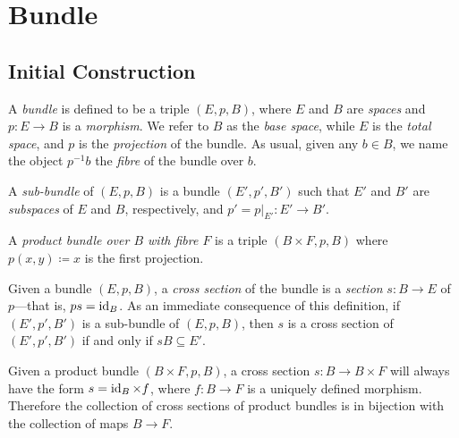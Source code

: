 \documentclass[../../../deep-dive]{subfile}
\begin{document}
\section{Bundle}

\subsection{Initial Construction}

\begin{definition}[Bundle]
    \label{def:bundle}
    A \emph{bundle} is defined to be a triple \((E, p, B)\), where \(E\) and \(B\)
    are \emph{spaces} and \(p: E \to B\) is a \emph{morphism}. We refer to \(B\) as
    the \emph{base space}, while \(E\) is the \emph{total space}, and \(p\) is the
    \emph{projection} of the bundle. As usual, given any \(b \in B\), we name the
    object \(p^{-1} b\) the \emph{fibre} of the bundle over \(b\).

    A \emph{sub-bundle} of \((E, p, B)\) is a bundle \((E', p', B')\) such that
    \(E'\) and \(B'\) are \emph{subspaces} of \(E\) and \(B\), respectively, and
    \(p' = p|_{E'}: E' \to B'\).
\end{definition}

\begin{definition}
    \label{def:product-bundle}
    A \emph{product bundle over \(B\) with fibre \(F\)} is a triple
    \((B \times F, p, B)\) where \(p(x, y) \coloneq x\) is the first projection.
\end{definition}

\begin{definition}
    \label{def:cross-section-bundle}
    Given a bundle \((E, p, B)\), a \emph{cross section} of the bundle is a
    \emph{section} \(s: B \to E\) of \(p\)---that is, \(p s = \operatorname{id}_B\). As
    an immediate consequence of this definition, if \((E', p', B')\) is a sub-bundle
    of \((E, p, B)\), then \(s\) is a cross section of \((E', p', B')\) if and only
    if \(s B \subseteq E'\).
\end{definition}

\begin{lemma}
    \label{lem:cross-section-of-product-bundle}
    Given a product bundle \((B \times F, p, B)\), a cross section
    \(s: B \to B \times F\) will always have the form \(s = \operatorname{id}_B \times f\), where
    \(f: B \to F\) is a uniquely defined morphism. Therefore the collection of cross
    sections of product bundles is in bijection with the collection of maps
    \(B \to F\).
\end{lemma}
\end{document}
